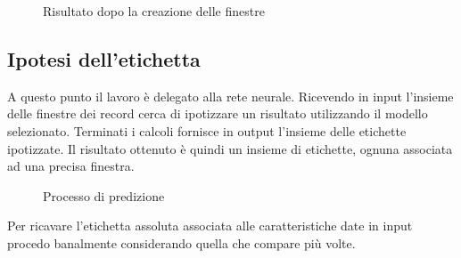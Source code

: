 \begin{figure}[H]
    \centering
    
    \caption{Risultato dopo la creazione delle finestre}
    \label{fig:segments}
\end{figure}



\subsection{Ipotesi dell'etichetta}
A questo punto il lavoro è delegato alla rete neurale.
Ricevendo in input l'insieme delle finestre dei record cerca di ipotizzare un risultato utilizzando 
il modello selezionato. Terminati i calcoli fornisce in output l'insieme delle etichette ipotizzate.
Il risultato ottenuto è quindi un insieme di etichette, ognuna associata ad una precisa finestra. 

\begin{figure}[H]
    \centering
    
    \caption{Processo di predizione}
    \label{fig:prediction}
\end{figure}

\noindent Per ricavare l'etichetta assoluta associata alle caratteristiche date in input procedo banalmente 
considerando quella che compare più volte.